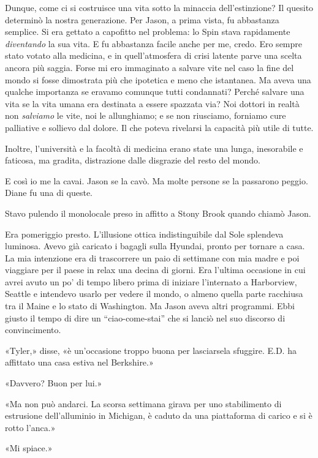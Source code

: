 Dunque, come ci si costruisce una vita sotto la minaccia
dell'estinzione? Il quesito determinò la nostra generazione. Per Jason,
a prima vista, fu abbastanza semplice. Si era gettato a capofitto nel
problema: lo Spin stava rapidamente \emph{diventando} la sua vita. E fu
abbastanza facile anche per me, credo. Ero sempre stato votato alla
medicina, e in quell'atmosfera di crisi latente parve una scelta ancora
più saggia. Forse mi ero immaginato a salvare vite nel caso la fine del
mondo si fosse dimostrata più che ipotetica e meno che istantanea. Ma
aveva una qualche importanza se eravamo comunque tutti condannati?
Perché salvare una vita se la vita umana era destinata a essere spazzata
via? Noi dottori in realtà non \emph{salviamo} le vite, noi le
allunghiamo; e se non riusciamo, forniamo cure palliative e sollievo dal
dolore. Il che poteva rivelarsi la capacità più utile di tutte.

Inoltre, l'università e la facoltà di medicina erano state una lunga,
inesorabile e faticosa, ma gradita, distrazione dalle disgrazie del
resto del mondo.

E così io me la cavai. Jason se la cavò. Ma molte persone se la
passarono peggio. Diane fu una di queste.

\separatorefiori

Stavo pulendo il monolocale preso in affitto a Stony Brook quando chiamò
Jason.

Era pomeriggio presto. L'illusione ottica indistinguibile dal Sole
splendeva luminosa. Avevo già caricato i bagagli sulla Hyundai, pronto
per tornare a casa. La mia intenzione era di trascorrere un paio di
settimane con mia madre e poi viaggiare per il paese in relax una decina
di giorni. Era l'ultima occasione in cui avrei avuto un po' di tempo
libero prima di iniziare l'internato a Harborview, Seattle e intendevo
usarlo per vedere il mondo, o almeno quella parte racchiusa tra il Maine
e lo stato di Washington. Ma Jason aveva altri programmi. Ebbi giusto il
tempo di dire un ``ciao-come-stai'' che si lanciò nel suo discorso di
convincimento.

«Tyler,» disse, «è un'occasione troppo buona per lasciarsela sfuggire.
E.D. ha affittato una casa estiva nel Berkshire.»

«Davvero? Buon per lui.»

«Ma non può andarci. La scorsa settimana girava per uno stabilimento di
estrusione dell'alluminio in Michigan, è caduto da una piattaforma di
carico e si è rotto l'anca.»

«Mi spiace.»

